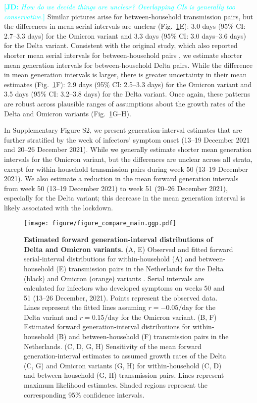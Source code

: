 \documentclass[12pt]{article}
\newcommand{\comment}{\showcomment}
\newcommand{\showcomment}[3]{\textcolor{#1}{\textbf{[#2: }\textsl{#3}\textbf{]}}}
\newcommand{\jd}[1]{\comment{cyan}{JD}{#1}}
\newcommand{\fref}[1]{Fig.~\ref{fig:#1}}
\begin{document}
\jd{How do we decide things are unclear? Overlapping CIs is generally too conservative.}
Similar pictures arise for between-household transmission pairs, but the differences in mean serial intervals are unclear (\fref{serial}E): 3.0 days (95\% CI: 2.7--3.3 days) for the Omicron variant and 3.3 days (95\% CI: 3.0 days--3.6 days) for the Delta variant.
Consistent with the original study, which also reported shorter mean serial intervals for between-household pairs \citep{backer2021omicron}, we estimate shorter mean generation intervals for between-household Delta pairs.
While the difference in mean generation intervals is larger, there is greater uncertainty in their mean estimates (\fref{serial}F): 2.9 days (95\% CI: 2.5--3.3 days) for the Omicron variant and 3.5 days (95\% CI: 3.2--3.8 days) for the Delta variant.
Once again, these patterns are robust across plausible ranges of assumptions about the growth rates of the Delta and Omicron variants (\fref{serial}G--H).

In Supplementary Figure S2, we present generation-interval estimates that are further stratified by the week of infectors' symptom onset (13--19 December 2021 and 20--26 December 2021).
While we generally estimate shorter mean generation intervals for the Omicron variant, but the differences are unclear across all strata, except for within-household transmission pairs during week 50 (13--19 December 2021).
We also estimate a reduction in the mean forward generation intervals from week 50 (13--19 December 2021) to week 51 (20--26 December 2021), especially for the Delta variant;
this decrease in the mean generation interval is likely associated with the lockdown.

\begin{figure}[!th]
\texttt{[image: figure/figure\_compare\_main.ggp.pdf]}
\caption{
\textbf{Estimated forward generation-interval distributions of Delta and Omicron variants.}
(A, E) Observed and fitted forward serial-interval distributions for within-household (A) and between-household (E) transmission pairs in the Netherlands for the Delta (black) and Omicron (orange) variants \citep{backer2021omicron}.
Serial intervals are calculated for infectors who developed symptoms on weeks 50 and 51 (13--26 December, 2021).
Points represent the observed data.
Lines represent the fitted lines assuming $r=-0.05/\textrm{day}$ for the Delta variant and $r=0.15/\textrm{day}$ for the Omicron variant.
(B, F) Estimated forward generation-interval distributions for within-household (B) and between-household (F) transmission pairs in the Netherlands.
(C, D, G, H) Sensitivity of the mean forward generation-interval estimates to assumed growth rates of the Delta (C, G) and Omicron variants (G, H) for within-household (C, D) and between-household (G, H) transmission pairs.
Lines represent maximum likelihood estimates.
Shaded regions represent the corresponding 95\% confidence intervals.
\label{fig:serial}
}
\end{figure}
\end{document}
